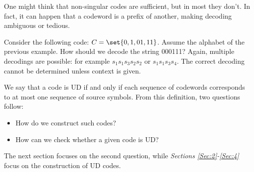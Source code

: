 \documentclass{subfiles}
\begin{document}
    One might think that non-singular codes are sufficient, 
        but in most they don't.
        In fact, it can happen that a codeword is a prefix of another,
        making decoding ambiguous or tedious.
    \begin{example*}
        Consider the following code: \(C = \set{0, 1, 01, 11}\). 
            Assume the alphabet of the previous example.
            How should we decode the string 000111? 
            Again, multiple decodings are possible:
            for example \(s_{1}s_{1}s_{3}s_{2}s_{2}\) or \(s_{1}s_{1}s_{3}s_{4}\).
            The correct decoding cannot be determined unless context is given.
    \end{example*}

    We say that a code is UD if and only if each sequence of codewords
        corresponds to at most one sequence of source symbols.
        From this definition, two questions follow:
        \begin{itemize}
            \item How do we construct such codes?
            \item How can we check whether a given code is UD?
        \end{itemize}

    The next section focuses on the second question, 
        while \emph{Sections \ref{Sec:2}-\ref{Sec:4}} focus on the construction of UD codes.
\end{document}

